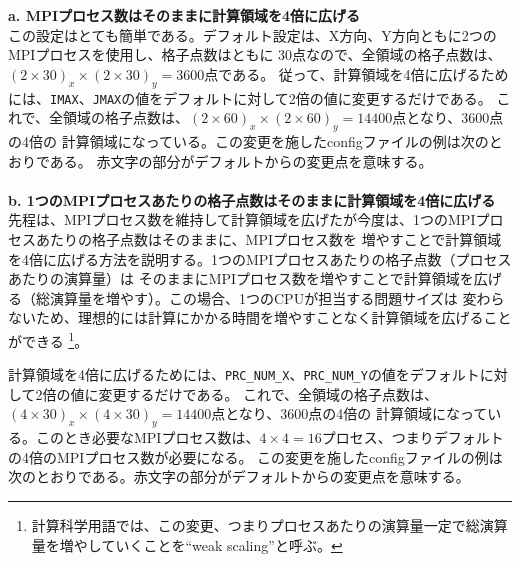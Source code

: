 {\bf a. MPIプロセス数はそのままに計算領域を4倍に広げる}\\

この設定はとても簡単である。デフォルト設定は、X方向、Y方向ともに2つのMPIプロセスを使用し、格子点数はともに
30点なので、全領域の格子点数は、$(2 \times 30)_{x} \times (2 \times 30)_{y} = 3600$点である。
従って、計算領域を4倍に広げるためには、\verb|IMAX|、\verb|JMAX|の値をデフォルトに対して2倍の値に変更するだけである。
これで、全領域の格子点数は、$(2 \times 60)_{x} \times (2 \times 60)_{y} = 14400$点となり、3600点の4倍の
計算領域になっている。この変更を施したconfigファイルの例は次のとおりである。
赤文字の部分がデフォルトからの変更点を意味する。\\

{\small {\gt
{}}}\\


{\bf b. 1つのMPIプロセスあたりの格子点数はそのままに計算領域を4倍に広げる}\\

先程は、MPIプロセス数を維持して計算領域を広げたが今度は、1つのMPIプロセスあたりの格子点数はそのままに、MPIプロセス数を
増やすことで計算領域を4倍に広げる方法を説明する。1つのMPIプロセスあたりの格子点数（プロセスあたりの演算量）は
そのままにMPIプロセス数を増やすことで計算領域を広げる（総演算量を増やす）。この場合、1つのCPUが担当する問題サイズは
変わらないため、理想的には計算にかかる時間を増やすことなく計算領域を広げることができる
\footnote{計算科学用語では、この変更、つまりプロセスあたりの演算量一定で総演算量を増やしていくことを``weak scaling''と呼ぶ。}。

計算領域を4倍に広げるためには、\verb|PRC_NUM_X|、\verb|PRC_NUM_Y|の値をデフォルトに対して2倍の値に変更するだけである。
これで、全領域の格子点数は、$(4 \times 30)_{x} \times (4 \times 30)_{y} = 14400$点となり、3600点の4倍の
計算領域になっている。このとき必要なMPIプロセス数は、$4 \times 4 = 16$プロセス、つまりデフォルトの4倍のMPIプロセス数が必要になる。
この変更を施したconfigファイルの例は次のとおりである。赤文字の部分がデフォルトからの変更点を意味する。\\

